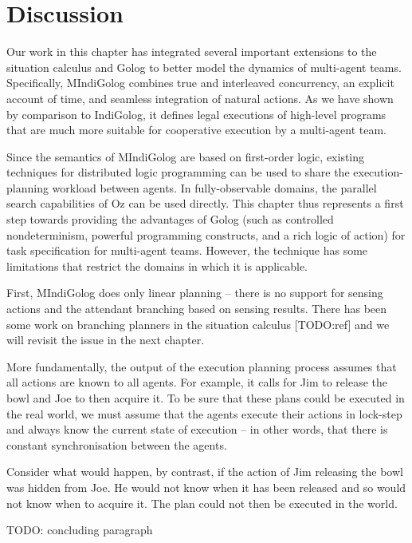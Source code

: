 \section{Discussion\label{sec:MIndiGolog:Discussion}}

Our work in this chapter has integrated several important extensions
to the situation calculus and Golog to better model the dynamics of
multi-agent teams. Specifically, MIndiGolog combines true and interleaved
concurrency, an explicit account of time, and seamless integration
of natural actions. As we have shown by comparison to IndiGolog, it
defines legal executions of high-level programs that are much more
suitable for cooperative execution by a multi-agent team.

Since the semantics of MIndiGolog are based on first-order logic,
existing techniques for distributed logic programming can be used
to share the execution-planning workload between agents. In fully-observable
domains, the parallel search capabilities of Oz can be used directly.
This chapter thus represents a first step towards providing the advantages
of Golog (such as controlled nondeterminism, powerful programming
constructs, and a rich logic of action) for task specification for
multi-agent teams. However, the technique has some limitations that
restrict the domains in which it is applicable.

First, MIndiGolog does only linear planning -- there is no support
for sensing actions and the attendant branching based on sensing results.
There has been some work on branching planners in the situation calculus
{[}TODO:ref] and we will revisit the issue in the next chapter.

More fundamentally, the output of the execution planning process assumes
that all actions are known to all agents. For example, it calls for
Jim to release the bowl and Joe to then acquire it. To be sure that
these plans could be executed in the real world, we must assume that
the agents execute their actions in lock-step and always know the
current state of execution -- in other words, that there is constant
synchronisation between the agents.

Consider what would happen, by contrast, if the action of Jim releasing
the bowl was hidden from Joe. He would not know when it has been released
and so would not know when to acquire it. The plan could not then
be executed in the world.

TODO: concluding paragraph

